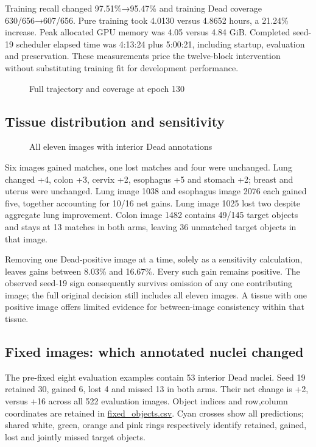 \documentclass[
  11pt,
]{article}
\begin{document}
Training recall changed 97.51\%→95.47\% and training Dead coverage
630/656→607/656. Pure training took 4.0130 versus 4.8652 hours, a
21.24\% increase. Peak allocated GPU memory was 4.05 versus 4.84 GiB.
Completed seed-19 scheduler elapsed time was 4:13:24 plus 5:00:21,
including startup, evaluation and preservation. These measurements price
the twelve-block intervention without substituting training fit for
development performance.

\begin{figure}[H]\centering

\caption{Full trajectory and coverage at epoch 130}
\end{figure}

\subsection{Tissue distribution and
sensitivity}\label{tissue-distribution-and-sensitivity}

\begin{figure}[H]\centering

\caption{All eleven images with interior Dead annotations}
\end{figure}

Six images gained matches, one lost matches and four were unchanged.
Lung changed +4, colon +3, cervix +2, esophagus +5 and stomach +2;
breast and uterus were unchanged. Lung image 1038 and esophagus image
2076 each gained five, together accounting for 10/16 net gains. Lung
image 1025 lost two despite aggregate lung improvement. Colon image 1482
contains 49/145 target objects and stays at 13 matches in both arms,
leaving 36 unmatched target objects in that image.

Removing one Dead-positive image at a time, solely as a sensitivity
calculation, leaves gains between 8.03\% and 16.67\%. Every such gain
remains positive. The observed seed-19 sign consequently survives
omission of any one contributing image; the full original decision still
includes all eleven images. A tissue with one positive image offers
limited evidence for between-image consistency within that tissue.

\subsection{Fixed images: which annotated nuclei
changed}\label{fixed-images-which-annotated-nuclei-changed}

The pre-fixed eight evaluation examples contain 53 interior Dead nuclei.
Seed 19 retained 30, gained 6, lost 4 and missed 13 in both arms. Their
net change is +2, versus +16 across all 522 evaluation images. Object
indices and row,column coordinates are retained in
\href{../fixed_objects.csv}{fixed\_objects.csv}. Cyan crosses show all
predictions; shared white, green, orange and pink rings respectively
identify retained, gained, lost and jointly missed target objects.
\end{document}
